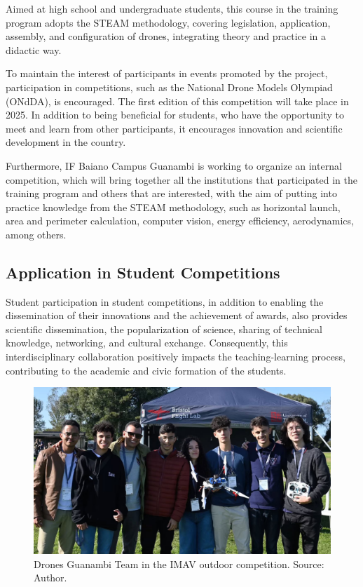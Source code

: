 \documentclass[conference]{IEEEtran}
\begin{document}
Aimed at high school and undergraduate students, this course in the training program adopts the STEAM methodology, covering legislation, application, assembly, and configuration of drones, integrating theory and practice in a didactic way.

To maintain the interest of participants in events promoted by the project, participation in competitions, such as the National Drone Models Olympiad (ONdDA), is encouraged. The first edition of this competition will take place in 2025. In addition to being beneficial for students, who have the opportunity to meet and learn from other participants, it encourages innovation and scientific development in the country.

Furthermore, IF Baiano Campus Guanambi is working to organize an internal competition, which will bring together all the institutions that participated in the training program and others that are interested, with the aim of putting into practice knowledge from the STEAM methodology, such as horizontal launch, area and perimeter calculation, computer vision, energy efficiency, aerodynamics, among others.

\subsection{Application in Student Competitions}

Student participation in student competitions, in addition to enabling the dissemination of their innovations and the achievement of awards, also provides scientific dissemination, the popularization of science, sharing of technical knowledge, networking, and cultural exchange. Consequently, this interdisciplinary collaboration positively impacts the teaching-learning process, contributing to the academic and civic formation of the students.

\begin{figure}[!htb]
    \centering
    \includegraphics[scale=0.30]{img/imav2024.png} 
    \caption{Drones Guanambi Team in the IMAV outdoor competition. Source: Author.}
    \label{fig:imav}
\end{figure}
\end{document}
